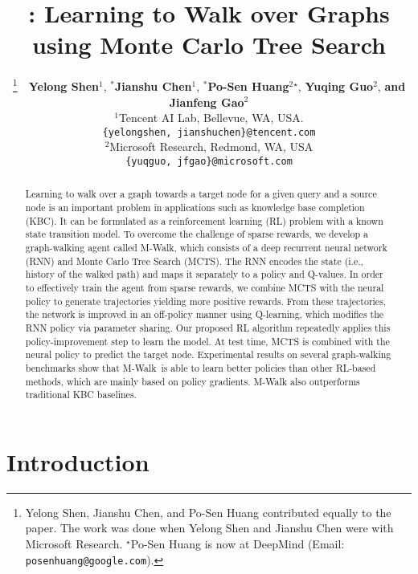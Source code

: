 \documentclass{article}
\title{\modelname: Learning to Walk over Graphs\\ using Monte Carlo Tree Search}
\author{
\thanks{Yelong Shen, Jianshu Chen, and Po-Sen Huang contributed equally to the paper. The work was done when Yelong Shen and Jianshu Chen were with Microsoft Research. $^\star$Po-Sen Huang is now at DeepMind (Email: \texttt{posenhuang@google.com}).}~~{\bf Yelong Shen}$^1$,
$^*${\bf Jianshu Chen}$^1$, 
$^*${\bf Po-Sen Huang}$^2$$^\star$,
{\bf Yuqing Guo}$^2$,
{\bf and Jianfeng Gao}$^2$ \\
$^1$Tencent AI Lab, Bellevue, WA, USA. \\
\texttt{\{yelongshen, jianshuchen\}@tencent.com}  \\
$^2$Microsoft Research, Redmond, WA, USA \\
\texttt{\{yuqguo, jfgao\}@microsoft.com}
}
\newcommand{\modelname}{M-Walk}
\begin{document}
\maketitle
		
\begin{abstract}
Learning to walk over a graph towards a target node for a given query and a source node is an important problem in applications such as knowledge base completion (KBC). It can be formulated as a reinforcement learning (RL) problem with a known state transition model. To overcome the challenge of sparse rewards, we develop a graph-walking agent called \modelname, which consists of a deep recurrent neural network (RNN) and Monte Carlo Tree Search (MCTS). The RNN encodes the state (i.e., history of the walked path) and maps it separately to a policy and Q-values. In order to effectively train the agent from sparse rewards, we combine MCTS with the neural policy to generate trajectories yielding more positive rewards. From these trajectories, the network is improved in an off-policy manner using Q-learning, which modifies the RNN policy via parameter sharing. Our proposed RL algorithm repeatedly applies this policy-improvement step to learn the model. At test time, MCTS is combined with the neural policy to predict the target node. Experimental results on several graph-walking benchmarks show that \modelname~is able to learn better policies than other RL-based methods, which are mainly based on policy gradients. M-Walk also outperforms traditional KBC baselines.
\end{abstract}
	
	
\section{Introduction}
\end{document}
